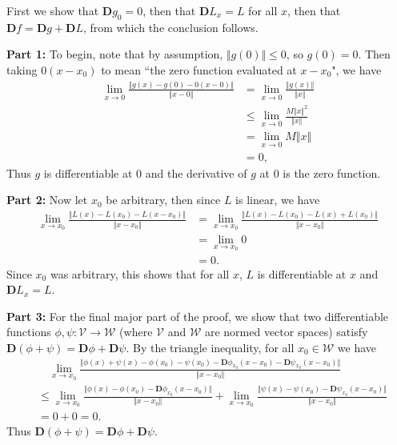 \documentclass[10pt]{amsart}
\begin{document}
First we show that $\mathbf{D}g_0 = 0$, then that $\mathbf{D}L_x = L$ for all $x$, then that $\mathbf{D}f = \mathbf{D}g + \mathbf{D}L$, from which the conclusion follows.

\textbf{Part 1:} To begin, note that by assumption, $\Vert{g(0)}\Vert\leq 0$, so $g(0)=0$. Then taking $0(x-x_0)$ to mean ``the zero function evaluated at $x-x_0$", we have
\begin{align*}
	\lim_{x \to 0} \frac{\Vert{g(x)-g(0)-0(x-0)}\Vert}{\Vert{x-0}\Vert} &= \lim_{x \to 0} \frac{\Vert{g(x)}\Vert}{\Vert{x}\Vert} \\
									       &\leq \lim_{x \to 0} \frac{M \Vert{x}\Vert^2}{\Vert{x}\Vert} \\
									       &= \lim_{x \to 0} M \Vert{x}\Vert \\
									       &= 0,
\end{align*}
Thus $g$ is differentiable at 0 and the derivative of $g$ at 0 is the zero function.

\textbf{Part 2:} Now let $x_0$ be arbitrary, then since $L$ is linear, we have
\begin{align*}
	\lim_{x \to x_0} \frac{\Vert{L(x)-L(x_0)-L(x-x_0)}\Vert}{\Vert{x-x_0}\Vert} &= \lim_{x \to x_0} \frac{\Vert{L(x)-L(x_0)-L(x)+L(x_0)}\Vert}{\Vert{x-x_0}\Vert} \\
											     &= \lim_{x \to x_0} 0 \\
											     &= 0.
\end{align*}
Since $x_0$ was arbitrary, this shows that for all $x$, $L$ is differentiable at $x$ and $\mathbf{D}L_x=L$.

\textbf{Part 3:} For the final major part of the proof, we show that two differentiable functions $\phi,\psi :\mathcal{V}\to\mathcal{W}$ (where $\mathcal{V}$ and $\mathcal{W}$ are normed vector spaces) satisfy $\mathbf{D}(\phi+\psi) = \mathbf{D}\phi + \mathbf{D}\psi$. By the triangle inequality, for all $x_0 \in \mathcal{W}$ we have
\begin{align*}
	&\quad \lim_{x \to x_0} \frac{\Vert{\phi(x)+\psi(x)-\phi(x_0)-\psi(x_0)-\mathbf{D}\phi_{x_0}(x-x_0)-\mathbf{D}\psi_{x_0}(x-x_0)}\Vert}{\Vert{x-x_0}\Vert} \\
	&\leq \lim_{x \to x_0} \frac{\Vert{\phi(x)-\phi(x_0)-\mathbf{D}\phi_{x_0}(x-x_0)}\Vert}{\Vert{x-x_0}\Vert} +\lim_{x \to x_0} \frac{\Vert{\psi(x)-\psi(x_0)-\mathbf{D}\psi_{x_0}(x-x_0)}\Vert}{\Vert{x-x_0}\Vert} \\
	&= 0 + 0 = 0.
\end{align*}
Thus $\mathbf{D}(\phi+\psi)=\mathbf{D}\phi + \mathbf{D}\psi$.
\end{document}
